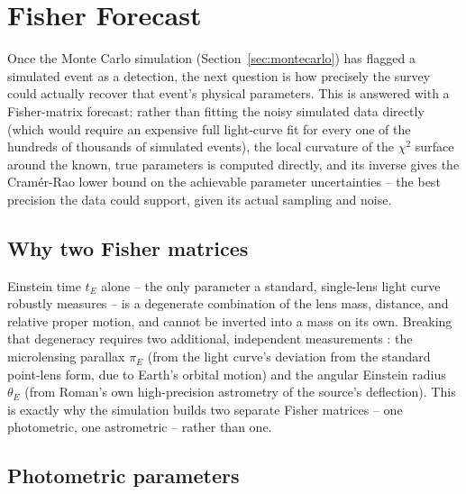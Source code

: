 \documentclass[english,10pt,a4paper]{article}
\begin{document}
	\section{Fisher Forecast}
	\label{sec:fisher}
	
	Once the Monte Carlo simulation (Section~\ref{sec:montecarlo}) has flagged a simulated event as a detection, the next question is how precisely the survey could actually recover that event's physical parameters. This is answered with a Fisher-matrix forecast: rather than fitting the noisy simulated data directly (which would require an expensive full light-curve fit for every one of the hundreds of thousands of simulated events), the local curvature of the $\chi^2$ surface around the known, true parameters is computed directly, and its inverse gives the Cram\'er-Rao lower bound on the achievable parameter uncertainties -- the best precision the data could support, given its actual sampling and noise.
	
	\subsection{Why two Fisher matrices}
	
	Einstein time $t_E$ alone -- the only parameter a standard, single-lens light curve \cite{Paczynski1986} robustly measures -- is a degenerate combination of the lens mass, distance, and relative proper motion, and cannot be inverted into a mass on its own. Breaking that degeneracy requires two additional, independent measurements \cite{Gould2000Formalism}: the microlensing parallax $\pi_E$ (from the light curve's deviation from the standard point-lens form, due to Earth's orbital motion) and the angular Einstein radius $\theta_E$ (from Roman's own high-precision astrometry of the source's deflection). This is exactly why the simulation builds two separate Fisher matrices -- one photometric, one astrometric -- rather than one.
	
	\subsection{Photometric parameters}
	
\end{document}
